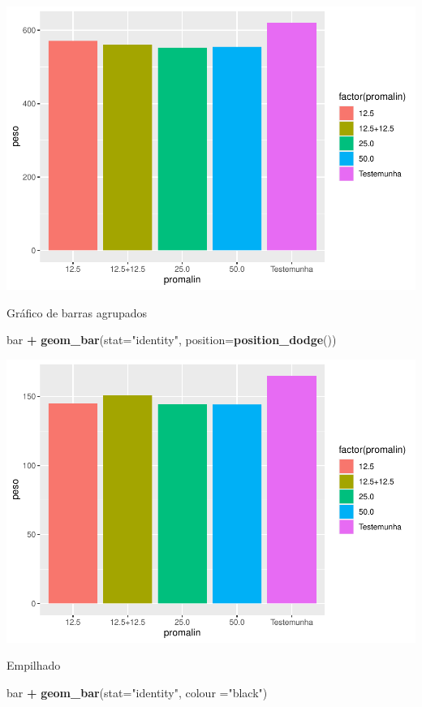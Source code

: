 \documentclass[
]{book}
\newenvironment{Shaded}{\begin{snugshade}}{\end{snugshade}}
\newcommand{\DataTypeTok}[1]{\textcolor[rgb]{0.13,0.29,0.53}{#1}}
\newcommand{\KeywordTok}[1]{\textcolor[rgb]{0.13,0.29,0.53}{\textbf{#1}}}
\newcommand{\NormalTok}[1]{#1}
\newcommand{\OperatorTok}[1]{\textcolor[rgb]{0.81,0.36,0.00}{\textbf{#1}}}
\newcommand{\StringTok}[1]{\textcolor[rgb]{0.31,0.60,0.02}{#1}}
\begin{document}
\includegraphics{TudodoR_files/figure-latex/unnamed-chunk-197-1.pdf}

Gráfico de barras agrupados

\begin{Shaded}
\begin{Highlighting}[]
\NormalTok{bar }\OperatorTok{+}\StringTok{   }\KeywordTok{geom_bar}\NormalTok{(}\DataTypeTok{stat=}\StringTok{"identity"}\NormalTok{, }\DataTypeTok{position=}\KeywordTok{position_dodge}\NormalTok{())}
\end{Highlighting}
\end{Shaded}

\includegraphics{TudodoR_files/figure-latex/unnamed-chunk-198-1.pdf}

Empilhado

\begin{Shaded}
\begin{Highlighting}[]
\NormalTok{bar }\OperatorTok{+}\StringTok{   }\KeywordTok{geom_bar}\NormalTok{(}\DataTypeTok{stat=}\StringTok{"identity"}\NormalTok{, }\DataTypeTok{colour =}\StringTok{"black"}\NormalTok{)}
\end{Highlighting}
\end{Shaded}
\end{document}
